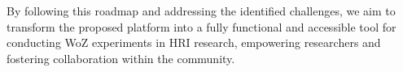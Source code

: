 \documentclass[letterpaper, 10 pt, conference]{ieeeconf}
\begin{document}
By following this roadmap and addressing the identified challenges, we aim to transform the proposed platform into a fully functional and accessible tool for conducting WoZ experiments in HRI research, empowering researchers and fostering collaboration within the community. 

%
%
%



\end{document}
